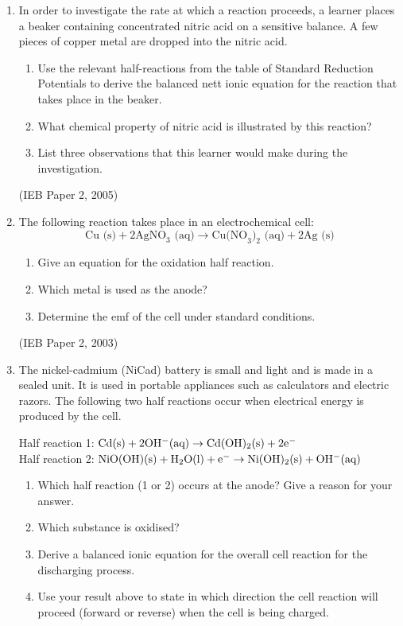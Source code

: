 \begin{eocexercises}{}
\begin{enumerate}
\begin{enumerate}
	\end{enumerate}


\item{In order to investigate the rate at which a reaction proceeds, a learner places a beaker containing concentrated nitric acid on a sensitive balance. A few pieces of copper metal are dropped into the nitric acid. }
	\begin{enumerate}
	\item{Use the relevant half-reactions from the table of Standard Reduction Potentials to derive the balanced nett ionic equation for the reaction that takes place in the beaker.}
	\item{What chemical property of nitric acid is illustrated by this reaction?}
	\item{List three observations that this learner would make during the investigation.}
	\end{enumerate}
(IEB Paper 2, 2005)
\item{The following reaction takes place in an electrochemical cell:
\begin{equation*}
\text{Cu (s)} + 2\text{AgNO}_{3}\text{ (aq)} \rightarrow \text{Cu(NO}_{3})_{2}\text{ (aq)} + 2\text{Ag (s)}
\end{equation*}

	\begin{enumerate}
	\item{Give an equation for the oxidation half reaction.}
	\item{Which metal is used as the anode?}
	\item{Determine the emf of the cell under standard conditions.}
	\end{enumerate}
}
(IEB Paper 2, 2003)
\item{The nickel-cadmium (NiCad) battery is small and light and is made in a sealed unit. It is used in portable appliances such as calculators and electric razors. The following two half reactions occur when electrical energy is produced by the cell.}

Half reaction 1: $\rm{Cd(s) + 2OH^{-}(aq) \rightarrow Cd(OH)_{2}(s) + 2e^{-}}$\\

Half reaction 2: $\rm{NiO(OH)(s) + H_{2}O(l) + e^{-} \rightarrow Ni(OH)_{2}(s) + OH^{-}(aq)}$

	\begin{enumerate}
	\item{Which half reaction (1 or 2) occurs at the anode? Give a reason for your answer.}
	\item{Which substance is oxidised?}
	\item{Derive a balanced ionic equation for the overall cell reaction for the discharging process.}
	\item{Use your result above to state in which direction the cell reaction will proceed (forward or reverse) when the cell is being charged.}
	\end{enumerate}


\end{enumerate}
\end{eocexercises}
